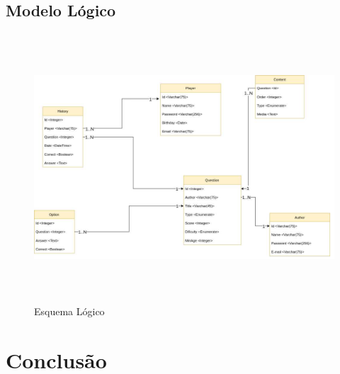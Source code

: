 \documentclass[11pt,a4paper]{report}
\begin{document}
\section{Modelo Lógico}

\begin{figure}[H]
\centering
\includegraphics[width = 14cm,height = 10cm]{EsqLog.png}
\caption{Esquema Lógico}
\label{fig:EsqLog}
\end{figure}

\chapter{Conclusão}
\end{document}
